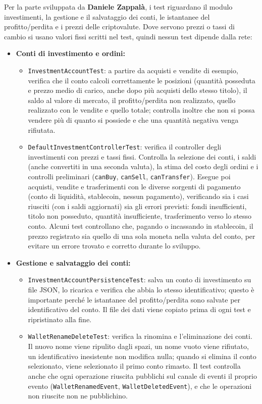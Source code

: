 \documentclass[11pt,a4paper,openright]{report}
\begin{document}
Per la parte sviluppata da \textbf{Daniele Zappalà}, i test riguardano il modulo investimenti, la gestione e il salvataggio dei conti, le istantanee del profitto/perdita e i prezzi delle criptovalute. Dove servono prezzi o tassi di cambio si usano valori fissi scritti nel test, quindi nessun test dipende dalla rete:
\begin{itemize}
    \item \textbf{Conti di investimento e ordini:}
    \begin{itemize}
        \item \texttt{InvestmentAccountTest}: a partire da acquisti e vendite di esempio, verifica che il conto calcoli correttamente le posizioni (quantità posseduta e prezzo medio di carico, anche dopo più acquisti dello stesso titolo), il saldo al valore di mercato, il profitto/perdita non realizzato, quello realizzato con le vendite e quello totale; controlla inoltre che non si possa vendere più di quanto si possiede e che una quantità negativa venga rifiutata.
        \item \texttt{DefaultInvestmentControllerTest}: verifica il controller degli investimenti con prezzi e tassi fissi. Controlla la selezione dei conti, i saldi (anche convertiti in una seconda valuta), la stima del costo degli ordini e i controlli preliminari (\texttt{canBuy}, \texttt{canSell}, \texttt{canTransfer}). Esegue poi acquisti, vendite e trasferimenti con le diverse sorgenti di pagamento (conto di liquidità, stablecoin, nessun pagamento), verificando sia i casi riusciti (con i saldi aggiornati) sia gli errori previsti: fondi insufficienti, titolo non posseduto, quantità insufficiente, trasferimento verso lo stesso conto. Alcuni test controllano che, pagando o incassando in stablecoin, il prezzo registrato sia quello di una sola moneta nella valuta del conto, per evitare un errore trovato e corretto durante lo sviluppo.
    \end{itemize}
    \item \textbf{Gestione e salvataggio dei conti:}
    \begin{itemize}
        \item \texttt{InvestmentAccountPersistenceTest}: salva un conto di investimento su file JSON, lo ricarica e verifica che abbia lo stesso identificativo; questo è importante perché le istantanee del profitto/perdita sono salvate per identificativo del conto. Il file dei dati viene copiato prima di ogni test e ripristinato alla fine.
        \item \texttt{WalletRenameDeleteTest}: verifica la rinomina e l'eliminazione dei conti. Il nuovo nome viene ripulito dagli spazi, un nome vuoto viene rifiutato, un identificativo inesistente non modifica nulla; quando si elimina il conto selezionato, viene selezionato il primo conto rimasto. Il test controlla anche che ogni operazione riuscita pubblichi sul canale di eventi il proprio evento (\texttt{WalletRenamedEvent}, \texttt{WalletDeletedEvent}), e che le operazioni non riuscite non ne pubblichino.

\end{itemize}
\end{itemize}
\end{document}

